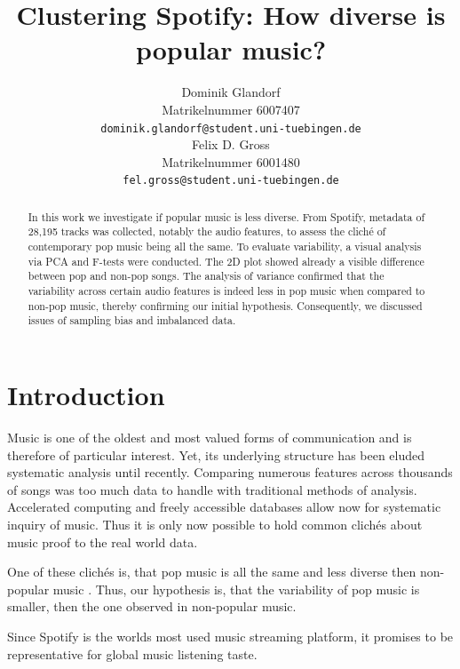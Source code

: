 \documentclass{article}
\title{Clustering Spotify: How diverse is popular music?}
\author{%
  Dominik Glandorf\\
  Matrikelnummer 6007407\\
  \texttt{dominik.glandorf@student.uni-tuebingen.de} \\
  \And
  Felix D. Gross\\
  Matrikelnummer 6001480\\
  \texttt{fel.gross@student.uni-tuebingen.de} \\
}
\begin{document}
\maketitle

\begin{abstract}
{In this work we investigate if popular music is less diverse. From Spotify, metadata of 28,195 tracks was collected, notably the audio features, to assess the cliché of contemporary pop music being all the same. To evaluate variability, a visual analysis via PCA and F-tests were conducted. The 2D plot showed already a visible difference between pop and non-pop songs. The analysis of variance confirmed that the variability across certain audio features is indeed less in pop music when compared to non-pop music, thereby confirming our initial hypothesis. Consequently, we discussed issues of sampling bias and imbalanced data.}
  
\end{abstract}

\section{Introduction}

Music is one of the oldest and most valued forms of communication and is therefore of particular interest. Yet, its underlying structure has been eluded systematic analysis until recently. Comparing numerous features across thousands of songs was too much data to handle with traditional methods of analysis. Accelerated computing and freely accessible databases allow now for systematic inquiry of music. Thus it is only now possible to hold common clichés about music proof to the real world data.

One of these clichés is, that pop music is all the same and less diverse then non-popular music \citep[see for example][]{serra2012measuring}. Thus, our hypothesis is, that the variability of pop music is smaller, then the one observed in non-popular music.

Since Spotify is the worlds most used music streaming platform, it promises to be representative for global music listening taste.

\end{document}

